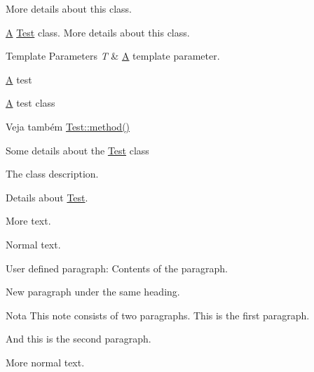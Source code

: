More details about this class.

\hyperlink{class_a}{A} \hyperlink{class_test}{Test} class. More details about this class. 
\begin{DoxyTemplParams}{Template Parameters}
{\em T} & \hyperlink{class_a}{A} template parameter.\\
\hline
\end{DoxyTemplParams}
\hyperlink{class_a}{A} test

\hyperlink{class_a}{A} test class \begin{DoxySeeAlso}{Veja também}
\hyperlink{class_test_ab202ef3dbfe96b1fef0b45b8c6844c37}{Test\-::method()}
\end{DoxySeeAlso}
Some details about the \hyperlink{class_test}{Test} class

The class description.

Details about \hyperlink{class_test}{Test}.

More text.

Normal text.

\begin{DoxyParagraph}{User defined paragraph\-:}
Contents of the paragraph.
\end{DoxyParagraph}
\begin{DoxyParagraph}{}
New paragraph under the same heading.
\end{DoxyParagraph}
\begin{DoxyNote}{Nota}
This note consists of two paragraphs. This is the first paragraph.
\end{DoxyNote}
\begin{DoxyParagraph}{}
And this is the second paragraph.
\end{DoxyParagraph}
More normal text. 


